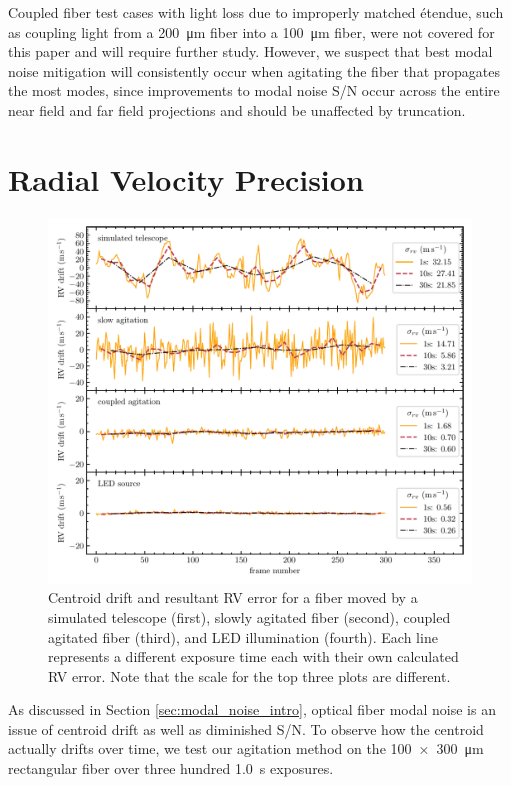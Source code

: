 \documentclass[twocolumn]{emulateapj}
\begin{document}
Coupled fiber test cases with light loss due to improperly matched \'etendue, such as coupling light from a \SI{200}{\micro\meter} fiber into a \SI{100}{\micro\meter} fiber, were not covered for this paper and will require further study. However, we suspect that best modal noise mitigation will consistently occur when agitating the fiber that propagates the most modes, since improvements to modal noise S/N occur across the entire near field and far field projections and should be unaffected by truncation.

\section{Radial Velocity Precision}
\label{sec:rv_precision}

\begin{figure}
\centering
	\includegraphics[width=\textwidth]{rv_error.pdf}
	\caption{Centroid drift and resultant RV error for a fiber moved by a simulated telescope (first), slowly agitated fiber (second), coupled agitated fiber (third), and LED illumination (fourth). Each line represents a different exposure time each with their own calculated RV error. Note that the scale for the top three plots are different.}
\label{fig:rv_error}
\end{figure}

As discussed in Section \ref{sec:modal_noise_intro}, optical fiber modal noise is an issue of centroid drift as well as diminished S/N. To observe how the centroid actually drifts over time, we test our agitation method on the \SI{100x300}{\micro\meter} rectangular fiber over three hundred \SI{1.0}{\second} exposures.
\end{document}
